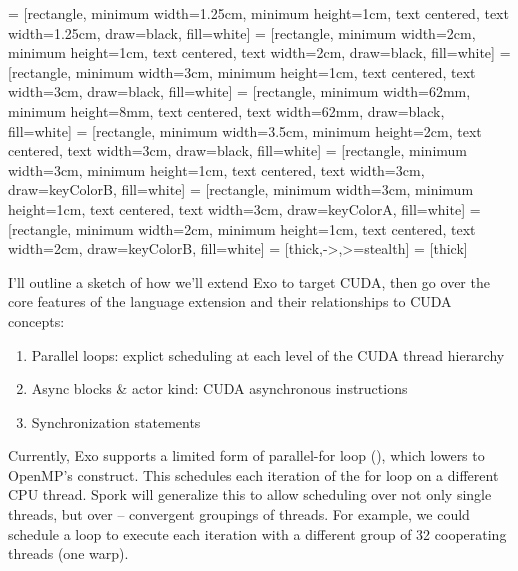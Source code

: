 


 = [rectangle, minimum width=1.25cm, minimum height=1cm, text centered, text width=1.25cm, draw=black, fill=white]
 = [rectangle, minimum width=2cm, minimum height=1cm, text centered, text width=2cm, draw=black, fill=white]
 = [rectangle, minimum width=3cm, minimum height=1cm, text centered, text width=3cm, draw=black, fill=white]
 = [rectangle, minimum width=62mm, minimum height=8mm, text centered, text width=62mm, draw=black, fill=white]
 = [rectangle, minimum width=3.5cm, minimum height=2cm, text centered, text width=3cm, draw=black, fill=white]
 = [rectangle, minimum width=3cm, minimum height=1cm, text centered, text width=3cm, draw=keyColorB, fill=white]
 = [rectangle, minimum width=3cm, minimum height=1cm, text centered, text width=3cm, draw=keyColorA, fill=white]
 = [rectangle, minimum width=2cm, minimum height=1cm, text centered, text width=2cm, draw=keyColorB, fill=white]
 = [thick,->,>=stealth]
 = [thick]



I'll outline a sketch of how we'll extend Exo to target CUDA, then go over the core features of the language extension and their relationships to CUDA concepts:

\begin{enumerate}
  \item Parallel loops: explict scheduling at each level of the CUDA thread hierarchy
  \item Async blocks \& actor kind: CUDA asynchronous instructions
  \item Synchronization statements
\end{enumerate}

\filbreak
{}

Currently, Exo supports a limited form of parallel-for loop (), which lowers to OpenMP's  construct.
This schedules each iteration of the for loop on a different CPU thread.
Spork will generalize this to allow scheduling over not only single threads, but over  -- convergent groupings of threads.
For example, we could schedule a loop to execute each iteration with a different group of 32 cooperating threads (one warp).


